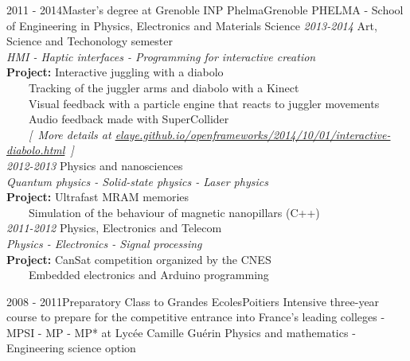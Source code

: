 \documentclass[a4paper]{genard-cv}
\begin{document}
\begin{body}
	\education
		\begin{entry}
			{2011 - 2014}{Master's degree at Grenoble INP Phelma}{Grenoble}
			{PHELMA - School of Engineering in Physics, Electronics and Materials Science}
			\textit{2013-2014} Art, Science and Techonology semester\\
			\textit{HMI - Haptic interfaces - Programming for interactive creation}\\
			\textbf{Project:} Interactive juggling with a diabolo\\
			~~~~Tracking of the juggler arms and diabolo with a Kinect\\
			~~~~Visual feedback with a particle engine that reacts to juggler movements\\
			~~~~Audio feedback made with SuperCollider\\
			~~~~{\itshape [~More details at \href{https://elaye.github.io/openframeworks/2014/10/01/interactive-diabolo.html}{elaye.github.io/openframeworks/2014/10/01/interactive-diabolo.html}~]}
			\medskip\\

			\textit{2012-2013} Physics and nanosciences\\
			\textit{Quantum physics - Solid-state physics - Laser physics}\\
			\textbf{Project:} Ultrafast MRAM memories\\
			~~~~Simulation of the behaviour of magnetic nanopillars (C++)
			\medskip\\

			\textit{2011-2012} Physics, Electronics and Telecom\\
			\textit{Physics - Electronics - Signal processing}\\
			\textbf{Project:} CanSat competition organized by the CNES\\
			~~~~Embedded electronics and Arduino programming
		\end{entry}
		\begin{entry}
			{2008 - 2011}{Preparatory Class to Grandes Ecoles}{Poitiers}
			{Intensive three-year course to prepare for the competitive entrance
			into France’s leading colleges - MPSI - MP - MP* at Lycée Camille Guérin}
			Physics and mathematics - Engineering science option
		\end{entry}

\end{body}
\end{document}
